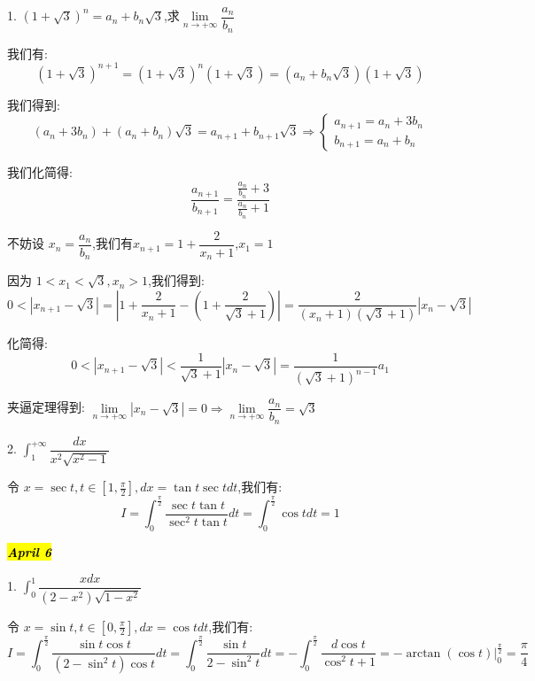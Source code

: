 1. $(1+\sqrt{3})^{n}=a_{n}+b_{n}\sqrt{3}$,求$\lim\limits_{n\rightarrow +\infty}\dfrac{a_{n}}{b_{n}}$
\begin{solution}
	
	我们有: 
	$$(1+\sqrt{3})^{n+1}=(1+\sqrt{3})^{n}(1+\sqrt{3})=(a_{n}+b_{n}\sqrt{3})(1+\sqrt{3})$$
	
	我们得到: 
	$$(a_{n}+3b_{n})+(a_{n}+b_{n})\sqrt{3}=a_{n+1}+b_{n+1}\sqrt{3}\Rightarrow\left\lbrace\begin{array}{l}
		a_{n+1}=a_{n}+3b_{n}\\b_{n+1}=a_{n}+b_{n}
	\end{array} \right. $$
	
	我们化简得: 
	$$\frac{a_{n+1}}{b_{n+1}}=\frac{\frac{a_{n}}{b_{n}}+3}{\frac{a_{n}}{b_{n}}+1}$$
	
	不妨设 $x_{n}=\dfrac{a_{n}}{b_{n}}$,我们有$x_{n+1}=1+\dfrac{2}{x_{n}+1}$,$x_{1}=1$
	
	因为 $1<x_{1}<\sqrt{3},x_{n}>1$,我们得到: 
	$$0<|x_{n+1}-\sqrt{3}|=|1+\frac{2}{x_{n}+1}-(1+\frac{2}{\sqrt{3}+1})|=\frac{2}{(x_{n}+1)(\sqrt{3}+1)}|x_{n}-\sqrt{3}|$$
	
	化简得: 
	$$0<|x_{n+1}-\sqrt{3}|<\frac{1}{\sqrt{3}+1}|x_{n}-\sqrt{3}|=\frac{1}{(\sqrt{3}+1)^{n-1}}a_{1}$$
	
	夹逼定理得到: $\lim\limits_{n\rightarrow +\infty}|x_{n}-\sqrt{3}|=0\Rightarrow \lim\limits_{n\rightarrow +\infty}\dfrac{a_{n}}{b_{n}}=\sqrt{3}$
\end{solution}

2. $\int_{1}^{+\infty}\dfrac{dx}{x^2\sqrt{x^{2}-1}}$
\begin{solution}
	
	令 $x=\sec t,t\in [1,\frac{\pi}{2}], dx=\tan t\sec tdt$,我们有: 
	$$I=\int_{0}^{\frac{\pi}{2}}\frac{\sec t\tan t}{\sec^2 t\tan t}dt=\int_{0}^{\frac{\pi}{2}}\cos tdt=1$$	
\end{solution}

\hl{\textbf{\textit{April 6}}}

1. $\int_{0}^{1}\dfrac{xdx}{(2-x^2)\sqrt{1-x^2}}$
\begin{solution}
	
	令 $x=\sin t,t\in[0,\frac{\pi}{2}],dx=\cos tdt$,我们有: 
	$$I=\int_{0}^{\frac{\pi}{2}}\frac{\sin t\cos t}{(2-\sin^2 t)\cos t}dt
	=\int_{0}^{\frac{\pi}{2}}\frac{\sin t}{2-\sin^2 t}dt=
	-\int_{0}^{\frac{\pi}{2}}\frac{d\cos t}{\cos^2 t+1}=-\arctan(\cos t)|_{0}^{\frac{\pi}{2}}=\frac{\pi}{4}$$
\end{solution}

